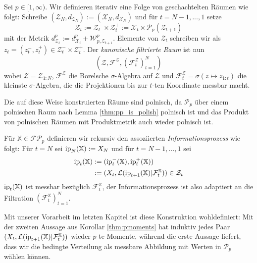 \begin{definition}
    Sei $p \in [1, \infty)$. Wir definieren iterativ eine Folge von geschachtelten Räumen wie folgt: Schreibe $(\mathcal{Z}_N, d_{\mathcal{Z}_N}) := (\mathcal{X}_N, d_{\mathcal{X}_N})$ und für $t=N-1, ..., 1$ setze
    \begin{equation}
        \mathcal{Z}_t := \mathcal{Z}_t^- \times \mathcal{Z}_t^+ := \mathcal{X}_t \times \mathcal{P}_p(\mathcal{Z}_{t+1})
    \end{equation}
    mit der Metrik $d^p_{\mathcal{Z}_t} := d^p_{\mathcal{X}_t} + \mathcal{W}^p_{p, \mathcal{Z}_{t+1}}$. Elemente von $\mathcal{Z}_t$ schreiben wir als $z_t=(z_t^-, z_t^+) \in \mathcal{Z}_t^- \times \mathcal{Z}_t^+$. Der \emph{kanonische filtrierte Raum} ist nun
    \begin{equation}
        (\mathcal{Z}, \mathcal{F}^\mathcal{Z}, (\mathcal{F}_t^\mathcal{Z})_{t=1}^N)
    \end{equation}
    wobei $\mathcal{Z} = \mathcal{Z}_{1:N}$, $\mathcal{F}^\mathcal{Z}$ die Borelsche $\sigma$-Algebra auf $\mathcal{Z}$ und $\mathcal{F}^\mathcal{Z}_t=\sigma(z \mapsto z_{1:t})$ die kleinste $\sigma$-Algebra, die die Projektionen bis zur $t$-ten Koordinate messbar macht.
\end{definition}
Die auf diese Weise konstruierten Räume sind polnisch, da $\mathcal{P}_p$ über einem polnischen Raum nach Lemma \ref{thm:pp_is_polish} polnisch ist und das Produkt von polnischen Räumen mit Produktmetrik auch wieder polnisch ist. 
\begin{definition}
Für $\mathbb{X}\in \mathcal{FP}_p$ definieren wir rekursiv den assoziierten \emph{Informationsprozess} wie folgt: Für $t=N$ sei $\operatorname{ip}_N(\mathbb{X}):=X_N$ und für $t=N-1,...,1$ sei
\begin{align*}
   \operatorname{ip}_t(\mathbb{X})&:=(\operatorname{ip}_t^-(\mathbb{X}), \operatorname{ip}_t^+(\mathbb{X})) \\
   &:= (X_t, \mathcal{L}(\operatorname{ip}_{t+1}(\mathbb{X}) \vert \mathcal{F}_t^{\mathbb{X}})) \in \mathcal{Z}_t
\end{align*}
$\operatorname{ip}_t(\mathbb{X})$ ist messbar bezüglich $\mathcal{F}_t^\mathbb{X}$, der Informationsprozess ist also adaptiert an die Filtration $\left(\mathcal{F}_t^\mathbb{X}\right)_{t=1}^N$.
\end{definition}
\begin{remark}
Mit unserer Vorarbeit im letzten Kapitel ist diese Konstruktion wohldefiniert: Mit der zweiten Aussage aus Korollar \ref{thm:pmoments} hat induktiv jedes Paar $(X_t, \mathcal{L}(\operatorname{ip}_{t+1}(\mathbb{X})\vert \mathcal{F}_t^\mathbb{X}))$ wieder $p$-te Momente, während die erste Aussage liefert, dass wir die bedingte Verteilung als messbare Abbildung mit Werten in $\mathcal{P}_p$ wählen können.
\end{remark}

